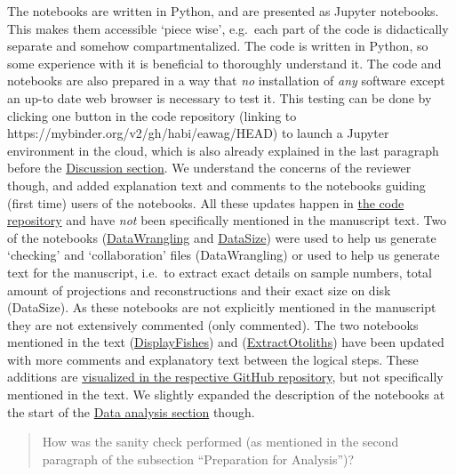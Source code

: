 \documentclass[color,english,personal]{ubletter}
\begin{document}
\begin{letter}{}
The notebooks are written in Python, and are presented as Jupyter
notebooks. This makes them accessible `piece wise', e.g.~each part of
the code is didactically separate and somehow compartmentalized. The
code is written in Python, so some experience with it is beneficial to
thoroughly understand it. The code and notebooks are also prepared in a
way that \emph{no} installation of \emph{any} software except an up-to
date web browser is necessary to test it. This testing can be done by
clicking one button in the code repository (linking to
https://mybinder.org/v2/gh/habi/eawag/HEAD) to launch a Jupyter
environment in the cloud, which is also already explained in the last
paragraph before the
\href{https://habi.github.io/EAWAG-manuscript/\#discussion}{Discussion
section}. We understand the concerns of the reviewer though, and added
explanation text and comments to the notebooks guiding (first time)
users of the notebooks. All these updates happen in
\href{https://github.com/habi/EAWAG}{the code repository} and have
\emph{not} been specifically mentioned in the manuscript text. Two of
the notebooks
(\href{https://nbviewer.org/github/habi/EAWAG/blob/main/DataWrangling.ipynb}{DataWrangling}
and
\href{https://nbviewer.org/github/habi/EAWAG/blob/main/DataSize.ipynb}{DataSize})
were used to help us generate `checking' and `collaboration' files
(DataWrangling) or used to help us generate text for the manuscript,
i.e.~to extract exact details on sample numbers, total amount of
projections and reconstructions and their exact size on disk (DataSize).
As these notebooks are not explicitly mentioned in the manuscript they
are not extensively commented (only commented). The two notebooks
mentioned in the text
(\href{https://nbviewer.org/github/habi/EAWAG/blob/main/DisplayFishes.ipynb}{DisplayFishes})
and
(\href{https://nbviewer.org/github/habi/EAWAG/blob/main/ExtractOtoliths.ipynb}{ExtractOtoliths})
have been updated with more comments and explanatory text between the
logical steps. These additions are
\href{https://github.com/habi/EAWAG/compare/v1.1...HEAD}{visualized in
the respective GitHub repository}, but not specifically mentioned in the
text. We slightly expanded the description of the notebooks at the start
of the
\href{https://habi.github.io/EAWAG-manuscript/\#data-analysis}{Data
analysis section} though.

\begin{quote}
How was the sanity check performed (as mentioned in the second paragraph
of the subsection ``Preparation for Analysis'')?
\end{quote}


\end{letter}
\end{document}
